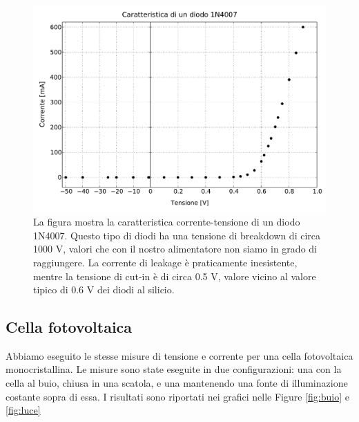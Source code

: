 \begin{figure}
    \includegraphics[scale=0.50]{diodo.pdf}
    \caption{La figura mostra la caratteristica corrente-tensione di un diodo 1N4007. Questo tipo di diodi
        ha una tensione di breakdown di circa 1000 V, valori che con il nostro alimentatore non siamo in grado di raggiungere.
        La corrente di leakage è praticamente inesistente, mentre la tensione di cut-in è di circa 0.5 V, valore vicino al valore
        tipico di 0.6 V dei diodi al silicio. }
    \label{fig:diodo}
\end{figure}

\subsection*{Cella fotovoltaica}

Abbiamo eseguito le stesse misure di tensione e corrente per una cella fotovoltaica monocristallina. Le misure sono state
eseguite in due configurazioni: una con la cella al buio, chiusa in una scatola, e una mantenendo una fonte di illuminazione costante
sopra di essa. I risultati sono riportati nei grafici nelle Figure \ref{fig:buio} e \ref{fig:luce}

